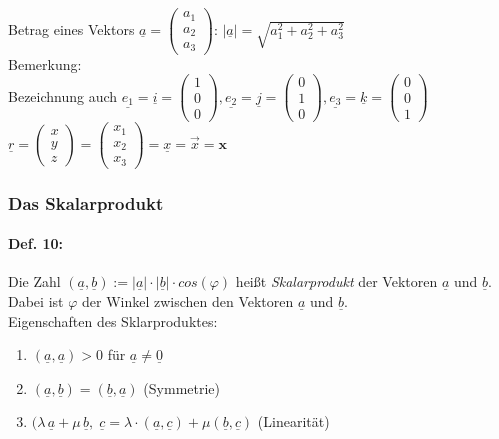 Betrag eines Vektors $\underline{a}=\begin{pmatrix}
a_1\\
a_2\\
a_3
\end{pmatrix}$: 
$\boxed{|\underline{a}|=\sqrt{a_1^2+a_2^2+a_3^2}}$\\
Bemerkung: \\
Bezeichnung auch $\underline{e_1}=\underline{i}=\begin{pmatrix}
1\\
0\\
0
\end{pmatrix}, \underline{e_2}=\underline{j}=\begin{pmatrix}
0\\
1\\
0
\end{pmatrix}, \underline{e_3}=\underline{k}=\begin{pmatrix}
0\\
0\\
1
\end{pmatrix}$\\
$\underline{r}=\begin{pmatrix}
x\\
y\\
z
\end{pmatrix}=\begin{pmatrix}
x_1\\
x_2\\
x_3
\end{pmatrix}=\underline{x}=\overrightarrow{x}=\textbf{x}$

\subsubsection{Das Skalarprodukt}
\paragraph{Def. 10:} \parskp
Die Zahl $(\underline{a}, \underline{b}):=|\underline{a}|\cdot |\underline{b}|\cdot cos (\varphi)$ heißt \emph{Skalarprodukt} der Vektoren $\underline{a}$ und $\underline{b}$. Dabei ist $\varphi$ der Winkel zwischen den Vektoren $\underline{a}$ und $\underline{b}$.\medskip\\
Eigenschaften des Sklarproduktes:
\begin{enumerate}[label=\alph*.)]
\item $(\underline{a}, \underline{a})>0$ für $\underline{a}\not = \underline{0}$
\item $(\underline{a}, \underline{b})=(\underline{b}, \underline{a})$ (Symmetrie)
\item $(\lambda\, \underline{a}+\mu\, \underline{b},\; \underline{c}=\lambda\cdot (\underline{a}, \underline{c})+\mu(\underline{b}, \underline{c})$ (Linearität)
\end{enumerate}

